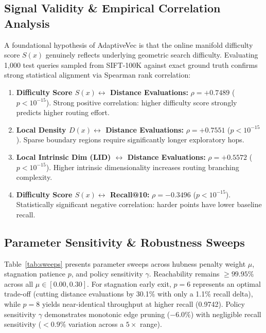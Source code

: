 \documentclass[conference,10pt]{IEEEtran}
\begin{document}
\subsection{Signal Validity \& Empirical Correlation Analysis}
A foundational hypothesis of AdaptiveVec is that the online manifold difficulty score $S(x)$ genuinely reflects underlying geometric search difficulty. Evaluating 1,000 test queries sampled from SIFT-100K against exact ground truth confirms strong statistical alignment via Spearman rank correlation:
\begin{enumerate}
    \item \textbf{Difficulty Score $S(x) \leftrightarrow$ Distance Evaluations:} $\rho = \mathbf{+0.7489}$ ($p < 10^{-15}$). Strong positive correlation: higher difficulty score strongly predicts higher routing effort.
    \item \textbf{Local Density $D(x) \leftrightarrow$ Distance Evaluations:} $\rho = \mathbf{+0.7551}$ ($p < 10^{-15}$). Sparse boundary regions require significantly longer exploratory hops.
    \item \textbf{Local Intrinsic Dim (LID) $\leftrightarrow$ Distance Evaluations:} $\rho = \mathbf{+0.5572}$ ($p < 10^{-15}$). Higher intrinsic dimensionality increases routing branching complexity.
    \item \textbf{Difficulty Score $S(x) \leftrightarrow$ Recall@10:} $\rho = \mathbf{-0.3496}$ ($p < 10^{-15}$). Statistically significant negative correlation: harder points have lower baseline recall.
\end{enumerate}

\subsection{Parameter Sensitivity \& Robustness Sweeps}
Table~\ref{tab:sweeps} presents parameter sweeps across hubness penalty weight $\mu$, stagnation patience $p$, and policy sensitivity $\gamma$. Reachability remains $\ge 99.95\%$ across all $\mu \in [0.00, 0.30]$. For stagnation early exit, $p=6$ represents an optimal trade-off (cutting distance evaluations by 30.1\% with only a 1.1\% recall delta), while $p=8$ yields near-identical throughput at higher recall (0.9742). Policy sensitivity $\gamma$ demonstrates monotonic edge pruning ($-6.0\%$) with negligible recall sensitivity ($<0.9\%$ variation across a $5\times$ range).
\end{document}
